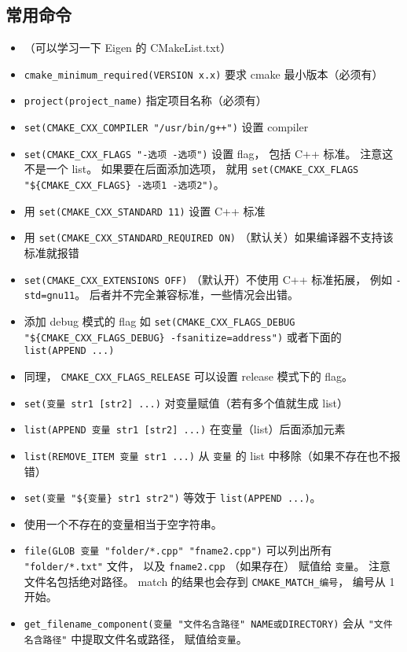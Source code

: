 \subsection{常用命令}
\begin{itemize}
\item （可以学习一下 Eigen 的 CMakeList.txt）
\item \verb`cmake_minimum_required(VERSION x.x)` 要求 cmake 最小版本（必须有）
\item \verb`project(project_name)` 指定项目名称（必须有）
\item \verb`set(CMAKE_CXX_COMPILER "/usr/bin/g++")` 设置 compiler
\item \verb`set(CMAKE_CXX_FLAGS "-选项 -选项")` 设置 flag， 包括 C++ 标准。 注意这不是一个 list。 如果要在后面添加选项， 就用 \verb`set(CMAKE_CXX_FLAGS "${CMAKE_CXX_FLAGS} -选项1 -选项2")`。
\item 用 \verb`set(CMAKE_CXX_STANDARD 11)` 设置 C++ 标准
\item 用 \verb`set(CMAKE_CXX_STANDARD_REQUIRED ON)` （默认关）如果编译器不支持该标准就报错
\item \verb`set(CMAKE_CXX_EXTENSIONS OFF)` （默认开）不使用 C++ 标准拓展， 例如 \verb`-std=gnu11`。 后者并不完全兼容标准，一些情况会出错。
\item 添加 debug 模式的 flag 如 \verb`set(CMAKE_CXX_FLAGS_DEBUG "${CMAKE_CXX_FLAGS_DEBUG} -fsanitize=address")` 或者下面的 \verb`list(APPEND ...)`
\item 同理， \verb`CMAKE_CXX_FLAGS_RELEASE` 可以设置 release 模式下的 flag。
\item \verb`set(变量 str1 [str2] ...)` 对变量赋值（若有多个值就生成 list）
\item \verb`list(APPEND 变量 str1 [str2] ...)` 在变量（list）后面添加元素
\item \verb`list(REMOVE_ITEM 变量 str1 ...)` 从 \verb`变量` 的 list 中移除（如果不存在也不报错）
\item \verb`set(变量 "${变量} str1 str2")` 等效于 \verb`list(APPEND ...)`。
\item 使用一个不存在的变量相当于空字符串。
\item \verb`file(GLOB 变量 "folder/*.cpp" "fname2.cpp")` 可以列出所有 \verb`"folder/*.txt"` 文件， 以及 \verb`fname2.cpp` （如果存在） 赋值给 \verb`变量`。 注意文件名包括绝对路径。 match 的结果也会存到 \verb`CMAKE_MATCH_编号`， 编号从 1 开始。
\item \verb`get_filename_component(变量 "文件名含路径" NAME或DIRECTORY)` 会从 \verb`"文件名含路径"` 中提取文件名或路径， 赋值给\verb`变量`。

\end{itemize}
